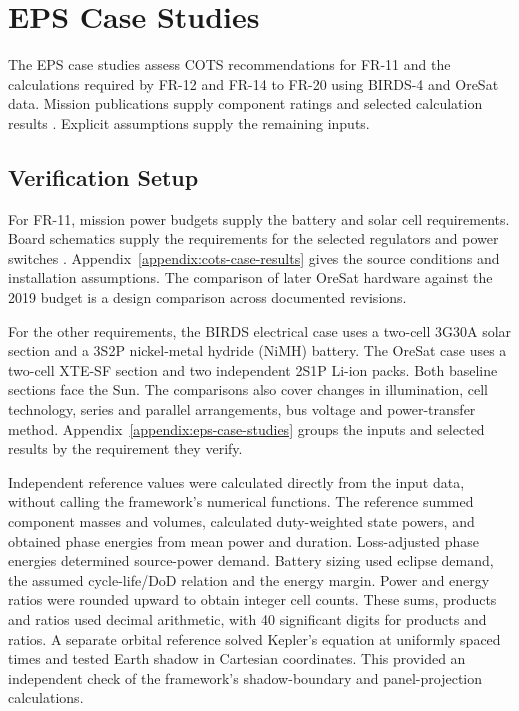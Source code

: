 \section{EPS Case Studies}
\label{section:eps-case-study-results}

The EPS case studies assess COTS recommendations for FR-11 and the calculations required by FR-12 and FR-14 to FR-20 using BIRDS-4 and OreSat data.
Mission publications supply component ratings and selected calculation results \citep{birds2021batteryverification,shrestha2022birds4powerbudget,greenberg2021oresat,oresat2025solardesign}.
Explicit assumptions supply the remaining inputs.

\subsection{Verification Setup}

For FR-11, mission power budgets supply the battery and solar cell requirements. Board schematics supply the requirements for the selected regulators and power switches \citep{birds4obchardware,oresatc3v5hardware}.
Appendix~\ref{appendix:cots-case-results} gives the source conditions and installation assumptions.
The comparison of later OreSat hardware against the 2019 budget is a design comparison across documented revisions.

For the other requirements, the BIRDS electrical case uses a two-cell 3G30A solar section and a 3S2P nickel-metal hydride (NiMH) battery.
The OreSat case uses a two-cell XTE-SF section and two independent 2S1P Li-ion packs.
Both baseline sections face the Sun.
The comparisons also cover changes in illumination, cell technology, series and parallel arrangements, bus voltage and power-transfer method.
Appendix~\ref{appendix:eps-case-studies} groups the inputs and selected results by the requirement they verify.

Independent reference values were calculated directly from the input data, without calling the framework's numerical functions.
The reference summed component masses and volumes, calculated duty-weighted state powers, and obtained phase energies from mean power and duration.
Loss-adjusted phase energies determined source-power demand.
Battery sizing used eclipse demand, the assumed cycle-life/DoD relation and the energy margin.
Power and energy ratios were rounded upward to obtain integer cell counts.
These sums, products and ratios used decimal arithmetic, with 40 significant digits for products and ratios.
A separate orbital reference solved Kepler's equation at uniformly spaced times and tested Earth shadow in Cartesian coordinates.
This provided an independent check of the framework's shadow-boundary and panel-projection calculations.

